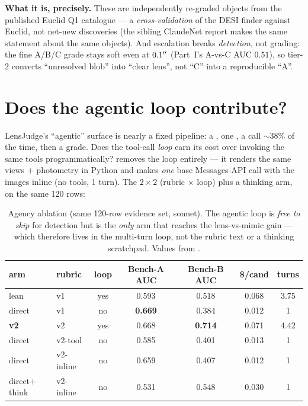 \documentclass[11pt,letterpaper]{article}
\newcommand{\eucRankAUC}{0.51}       %
\begin{document}
\textbf{What it is, precisely.} These are independently re-graded objects from the published Euclid
Q1 catalogue --- a \emph{cross-validation} of the DESI finder against Euclid, not net-new discoveries
(the sibling ClaudeNet report makes the same statement about the same objects). And escalation breaks
\emph{detection}, not grading: the fine A/B/C grade stays soft even at $0.1^{\prime\prime}$ (Part~I's A-vs-C
AUC $\eucRankAUC$), so tier-2 converts ``unresolved blob'' into ``clear lens'', not ``C'' into a
reproducible ``A''.

\section{Does the agentic loop contribute?}
\label{sec:v2agency}
LensJudge's ``agentic'' surface is nearly a fixed pipeline: a , one
, a  call ${\sim}38\%$ of the time, then a grade. Does the
tool-call \emph{loop} earn its cost over invoking the same tools programmatically?
 removes the loop entirely --- it renders the same views $+$
photometry in Python and makes \emph{one} base Messages-API call with the images inline (no tools, 1
turn). The $2\times2$ (rubric $\times$ loop) plus a thinking arm, on the same 120 rows:

\begin{table}[h]\centering
\caption{Agency ablation (same 120-row evidence set, sonnet). The agentic loop is \emph{free to
skip} for detection but is the \emph{only} arm that reaches the lens-vs-mimic gain --- which
therefore lives in the multi-turn loop, not the rubric text or a thinking scratchpad. Values from
.}
\label{tab:v2ablation}
\small
\begin{tabular}{llccccc}
\toprule
arm & rubric & loop & Bench-A AUC & Bench-B AUC & \$/cand & turns\\
\midrule
lean             & v1        & yes & 0.593 & 0.518          & 0.068 & 3.75\\
direct           & v1        & no  & \textbf{0.669} & 0.384 & 0.012 & 1\\
\textbf{v2}      & v2        & yes & 0.668 & \textbf{0.714} & 0.071 & 4.42\\
direct           & v2-tool   & no  & 0.585 & 0.401          & 0.013 & 1\\
direct           & v2-inline & no  & 0.659 & 0.407          & 0.012 & 1\\
direct$+$think   & v2-inline & no  & 0.531 & 0.548          & 0.030 & 1\\
\bottomrule
\end{tabular}
\end{table}
\end{document}
